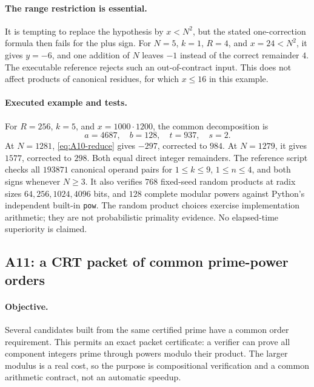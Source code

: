 \documentclass[11pt,a4paper]{article}
\theoremstyle{definition}\newtheorem{definition}[theorem]{Definition}
\theoremstyle{remark}\newtheorem{remark}[theorem]{Remark}
\begin{document}
\paragraph{The range restriction is essential.}
It is tempting to replace the hypothesis by $x<N^2$, but the stated
one-correction formula then fails for the plus sign. For $N=5$, $k=1$,
$R=4$, and $x=24<N^2$, it gives $y=-6$, and one addition of $N$ leaves
$-1$ instead of the correct remainder $4$. The executable reference
rejects such an out-of-contract input. This does not affect products of
canonical residues, for which $x\le16$ in this example.

\paragraph{Executed example and tests.}
For $R=256$, $k=5$, and $x=1000\cdot1200$, the common decomposition is
\[
 a=4687,\quad b=128,\quad t=937,\quad s=2.
\]
At $N=1281$, \eqref{eq:A10-reduce} gives $-297$, corrected to $984$.
At $N=1279$, it gives $1577$, corrected to $298$.
Both equal direct integer remainders. The reference script checks all
$193871$ canonical operand pairs for $1\le k\le9$, $1\le n\le4$, and
both signs whenever $N\ge3$. It also verifies $768$ fixed-seed random
products at radix sizes $64,256,1024,4096$ bits, and $128$ complete modular
powers against Python's independent built-in \texttt{pow}.
The random product choices exercise implementation arithmetic; they are not
probabilistic primality evidence. No elapsed-time superiority is claimed.

\subsection{A11: a CRT packet of common prime-power orders}
\label{alg:A11}

\paragraph{Objective.}
Several candidates built from the same certified prime have a common order
requirement. This permits an exact packet certificate: a verifier can prove
all component integers prime through powers modulo their product. The
larger modulus is a real cost, so the purpose is compositional verification
and a common arithmetic contract, not an automatic speedup.
\end{document}
